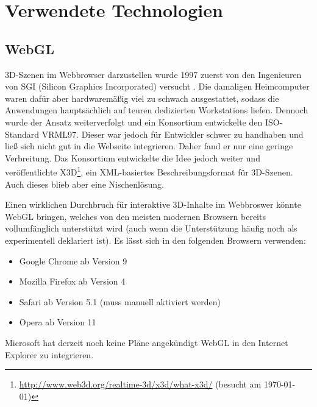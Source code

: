 \chapter{Verwendete Technologien}
\label{chap:technologien}

\section{WebGL}
\label{sec:webgl}
3D-Szenen im Webbrowser darzustellen wurde 1997 zuerst von den Ingenieuren von SGI (Silicon Graphics Incorporated) versucht \autocite[110]{Zielgerichtet}. Die damaligen Heimcomputer waren dafür aber hardwaremäßig viel zu schwach ausgestattet, sodass die Anwendungen hauptsächlich auf teuren dedizierten Workstations liefen. Dennoch wurde der Ansatz weiterverfolgt und ein Konsortium entwickelte den ISO-Standard VRML97. Dieser war jedoch für Entwickler schwer zu handhaben und ließ sich nicht gut in die Webseite integrieren. Daher fand er nur eine geringe Verbreitung. Das Konsortium entwickelte die Idee jedoch weiter und veröffentlichte X3D\footnote{\url{http://www.web3d.org/realtime-3d/x3d/what-x3d/} (besucht am \today)}, ein XML-basiertes Beschreibungsformat für 3D-Szenen. Auch dieses blieb aber eine Nischenlösung.

Einen wirklichen Durchbruch für interaktive 3D-Inhalte im Webbroswer könnte WebGL bringen, welches von den meisten modernen Browsern bereits vollumfänglich unterstützt wird (auch wenn die Unterstützung häufig noch als experimentell deklariert ist). Es lässt sich in den folgenden Browsern verwenden:
\begin{itemize}
    \item Google Chrome ab Version 9
    \item Mozilla Firefox ab Version 4
    \item Safari ab Version 5.1 (muss manuell aktiviert werden)
    \item Opera ab Version 11
\end{itemize}
Microsoft hat derzeit noch keine Pläne angekündigt WebGL in den Internet Explorer zu integrieren.


